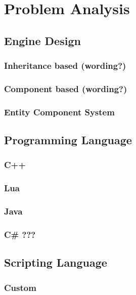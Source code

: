 \chapter{Problem Analysis}

\section{Engine Design}

\subsection{Inheritance based (wording?)}

\subsection{Component based (wording?)}

\subsection{Entity Component System}

\section{Programming Language}

\subsection{C++}

\subsection{Lua}

\subsection{Java}

\subsection{C\# ???}

\section{Scripting Language}

\subsection{Custom}

